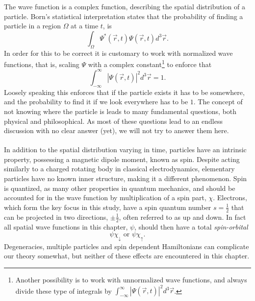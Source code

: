 The wave function is a complex function, describing the spatial distribution of a particle.
Born's statistical interpretation states that the probability of finding a
particle in a region $\Omega$ at a time $t$, is
\begin{equation}
\int_{\Omega} \Psi^{*}(\vec{r},t) \Psi(\vec{r},t) d^3\vec{r} .
\end{equation}
In order for this to be correct it is customary to work with normalized wave
functions, that is, scaling $\Psi$ with a complex 
constant\footnote{Another possibility is to work
with unnormalized wave functions, and always divide these type of integrals by
$\int_{-\infty}^{\infty} \left| \Psi(\vec{r},t) \right|^2 d^3\vec{r}$.}
to enforce that
\begin{equation}
\int_{-\infty}^{\infty} \left| \Psi(\vec{r},t) \right|^2 d^3\vec{r} = 1 .
\end{equation}
Loosely speaking this enforces that if the particle exists it has to be somewhere, and the probability to find it if we look everywhere has to be $1$.
The concept of not knowing where the particle is leads to many fundamental
questions, both physical and philosophical.
As most of these questions lead to an endless discussion with no clear answer
(yet), we will not try to answer them here. 

\paragraph*{}
In addition to the spatial distribution varying in time, particles have an intrinsic property, possessing a magnetic dipole moment, known as spin.
Despite acting similarly to a charged rotating body in classical electrodynamics, elementary particles have no known inner structure, making it a different phenomenon.
Spin is quantized, as many other properties in quantum mechanics, and should be accounted for in the wave function by multiplication of a spin part, $\chi$.
Electrons, which form the key focus in this study, have a spin quantum number $s = \frac{1}{2}$ that can be projected in two directions, $\pm\frac{1}{2}$, often referred to as up and down.
In fact all spatial wave functions in this chapter, $\psi$, should then have a total \textit{spin-orbital} 
\begin{equation}
\psi \chi_{\downarrow} \textrm{ or } \psi \chi_{\uparrow} .
\end{equation}
Degeneracies, multiple particles and spin dependent Hamiltonians can complicate our theory somewhat, but neither of these effects are encountered in this chapter.



